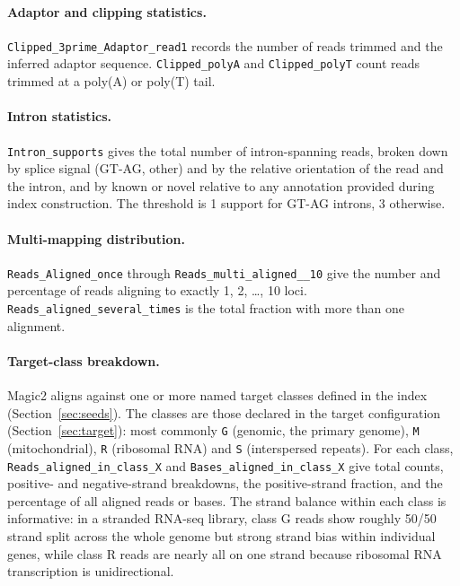 \documentclass[11pt]{article}
\begin{document}
\paragraph{Adaptor and clipping statistics.}
\texttt{Clipped\_3prime\_Adaptor\_read1} records the number of
reads trimmed and the inferred adaptor sequence.
\texttt{Clipped\_polyA} and \texttt{Clipped\_polyT} count reads
trimmed at a poly(A) or poly(T) tail.

\paragraph{Intron statistics.}
\texttt{Intron\_supports} gives the total number of intron-spanning
reads, broken down by splice signal (GT-AG, other) and
by the relative orientation of the read and the intron, and by known or novel
relative to any annotation provided during index construction.
The threshold is 1 support for GT-AG introns, 3 otherwise.

\paragraph{Multi-mapping distribution.}
\texttt{Reads\_Aligned\_once} through
\texttt{Reads\_multi\_aligned\_\_10} give the number and percentage
of reads aligning to exactly 1, 2, \ldots, 10 loci.
\texttt{Reads\_aligned\_several\_times} is the total fraction with
more than one alignment.

\paragraph{Target-class breakdown.}
Magic2 aligns against one or more named target classes defined in
the index (Section~\ref{sec:seeds}).
The classes are those declared in the target configuration
(Section~\ref{sec:target}): most commonly \texttt{G} (genomic, the
primary genome), \texttt{M} (mitochondrial), \texttt{R} (ribosomal RNA)
and \texttt{S} (interspersed repeats).
For each class, \texttt{Reads\_aligned\_in\_class\_X} and
\texttt{Bases\_aligned\_in\_class\_X} give total counts, positive-
and negative-strand breakdowns, the positive-strand fraction, and
the percentage of all aligned reads or bases.
The strand balance within each class is informative: in a stranded
RNA-seq library, class G reads show roughly 50/50 strand split
across the whole genome but strong strand bias within individual
genes, while class R reads are nearly all on one strand because
ribosomal RNA transcription is unidirectional.
\end{document}
